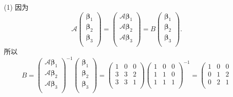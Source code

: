 \begin{enumerate}[1~]
\begin{solution}
(1) 因为\[
\mathscr{A}\left( \begin{array}{c}
	\boldsymbol{\beta} _1\\
	\boldsymbol{\beta} _2\\
	\boldsymbol{\beta} _3\\
\end{array} \right) =\left( \begin{array}{c}
	\mathscr{A}\boldsymbol{\beta} _1\\
	\mathscr{A}\boldsymbol{\beta} _2\\
	\mathscr{A}\boldsymbol{\beta} _3\\
\end{array} \right) =B\left( \begin{array}{c}
	\boldsymbol{\beta} _1\\
	\boldsymbol{\beta} _2\\
	\boldsymbol{\beta} _3\\
\end{array} \right) .
\]
所以\[
B=\left( \begin{array}{c}
	\mathscr{A}\boldsymbol{\beta} _1\\
	\mathscr{A}\boldsymbol{\beta} _2\\
	\mathscr{A}\boldsymbol{\beta} _3\\
\end{array} \right) ^{-1}\left( \begin{array}{c}
	\boldsymbol{\beta} _1\\
	\boldsymbol{\beta} _2\\
	\boldsymbol{\beta} _3\\
\end{array} \right) =\left( \begin{matrix}
	1&		0&		0\\
	3&		3&		2\\
	3&		3&		1\\
\end{matrix} \right) \left( \begin{matrix}
	1&		0&		0\\
	1&		1&		0\\
	1&		1&		1\\
\end{matrix} \right)^{-1} =\left(
\begin{array}{ccc}
 1 & 0 & 0 \\
 0 & 1 & 2 \\
 0 & 2 & 1 \\
\end{array}
\]
\end{solution}
\end{enumerate}
